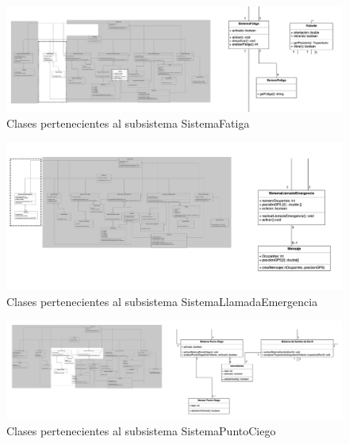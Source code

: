 \begin{figure}[H]
\begin{center}
\includegraphics[width=1\textwidth]{./img/SistemaFatiga.png}
\end{center}
\caption{Clases pertenecientes al subsistema SistemaFatiga}
\label{tab:c_SistemaFatigaPNG}
\end{figure}

\begin{figure}[H]
\begin{center}
\includegraphics[width=1\textwidth]{./img/SistemaLlamadaEmergencia.png}
\end{center}
\caption{Clases pertenecientes al subsistema SistemaLlamadaEmergencia}
\label{tab:c_SistemaLlamadaEmergenciaPNG}
\end{figure}



\begin{figure}[H]
\begin{center}
\includegraphics[width=1\textwidth]{./img/SistemaPuntoCiego.png}
\end{center}
\caption{Clases pertenecientes al subsistema SistemaPuntoCiego}
\label{tab:c_SistemaPuntoCiegoPNG}
\end{figure}


